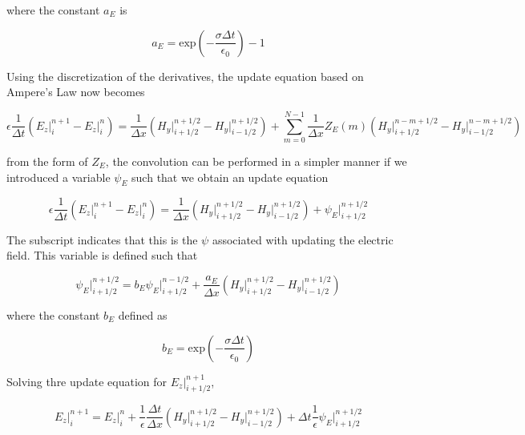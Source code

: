 \documentclass{article}
\begin{document}
where the constant \(a_E\) is

\begin{equation}
a_E = \mathrm{exp}\left ( - \dfrac{\sigma \Delta t}{\epsilon_0} \right ) -1 
\end{equation}

    Using the discretization of the derivatives, the update equation based
on Ampere's Law now becomes

\begin{equation}
\epsilon \dfrac{1}{\Delta t} \left ( E_z \Big |^{n+1}_{i} - E_z \Big |^{n}_{i} \right ) = \dfrac{1}{\Delta x} \left ( H_y \Big |^{n+1/2}_{i+1/2} - H_y \Big |^{n+1/2}_{i-1/2} \right ) + \sum^{N-1}_{m=0} \dfrac{1}{\Delta x} Z_E (m) \left ( H_y \Big |^{n-m+1/2}_{i+1/2} - H_y \Big |^{n-m+1/2}_{i-1/2} \right )
\end{equation}

from the form of \(Z_E\), the convolution can be performed in a simpler
manner if we introduced a variable \(\psi_E\) such that we obtain an
update equation

\begin{equation}
\epsilon \dfrac{1}{\Delta t} \left ( E_z \Big |^{n+1}_{i} - E_z \Big |^{n}_{i} \right ) = \dfrac{1}{\Delta x} \left ( H_y \Big |^{n+1/2}_{i+1/2} - H_y \Big |^{n+1/2}_{i-1/2} \right ) + \psi_E \Big |^{n+1/2}_{i+1/2}
\end{equation}

The subscript indicates that this is the \(\psi\) associated with
updating the electric field. This variable is defined such that

\begin{equation}
\psi_E \Big |^{n+1/2}_{i+1/2} = b_E \psi_E \Big |^{n-1/2}_{i+1/2} + \dfrac{a_E}{\Delta x} \left ( H_y \Big |^{n+1/2}_{i+1/2} - H_y \Big |^{n+1/2}_{i-1/2} \right )
\end{equation}

where the constant \(b_E\) defined as

\begin{equation}
b_E = \mathrm{exp}\left ( - \dfrac{\sigma \Delta t}{\epsilon_0} \right )
\end{equation}

Solving thre update equation for \(E_z \Big |^{n+1}_{i+1/2}\),

\begin{equation}
E_z \Big |^{n+1}_{i} = E_z \Big |^{n}_{i} + \dfrac{1}{\epsilon} \dfrac{\Delta t}{\Delta x} \left ( H_y \Big |^{n+1/2}_{i+1/2} - H_y \Big |^{n+1/2}_{i-1/2} \right ) + \Delta t \dfrac{1}{\epsilon} \psi_E \Big |^{n+1/2}_{i+1/2}
\end{equation}
\end{document}
